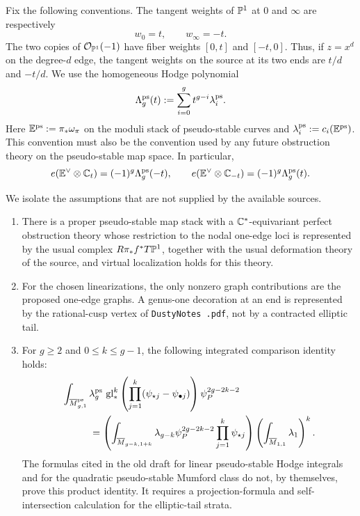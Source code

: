 \documentclass[12pt]{memoir}
\begin{document}
Fix the following conventions.  The tangent weights of \(\mathbb{P}^1\) at
\(0\) and \(\infty\) are respectively
\[
  w_0=t,\qquad w_\infty=-t.
\]
The two copies of \(\mathcal{O}_{\mathbb{P}^1}(-1)\) have fiber weights
\([0,t]\) and \([-t,0]\).  Thus, if \(z=x^d\) on the degree-\(d\)
edge, the tangent weights on the source at its two ends are \(t/d\)
and \(-t/d\).  We use the homogeneous Hodge polynomial
\[
  \Lambda_g^{\operatorname{\mathrm{ps}}}(t):=\sum_{i=0}^g t^{g-i}\lambda_i^{\operatorname{\mathrm{ps}}}.
\]
Here \(\mathbb{E}^{\operatorname{\mathrm{ps}}}:=\pi_*\omega_\pi\) on the moduli stack of
pseudo-stable curves and \(\lambda_i^{\operatorname{\mathrm{ps}}}:=c_i(\mathbb{E}^{\operatorname{\mathrm{ps}}})\).  This convention
must also be the convention used by any future obstruction theory on the
pseudo-stable map space.
In particular,
\[
 e(\mathbb{E}^\vee\otimes\mathbb{C}_t)=(-1)^g\Lambda_g^{\operatorname{\mathrm{ps}}}(-t),\qquad
 e(\mathbb{E}^\vee\otimes\mathbb{C}_{-t})=(-1)^g\Lambda_g^{\operatorname{\mathrm{ps}}}(t).
\]

We isolate the assumptions that are not supplied by the available sources.

\begin{enumerate}
  \item[(A1)] There is a proper pseudo-stable map stack with a
  \(\mathbb{C}^*\)-equivariant perfect obstruction theory whose restriction to the
  nodal one-edge loci is represented by the usual complex
  \(R\pi_*f^*T\mathbb{P}^1\), together with the usual deformation theory of the
  source, and virtual localization holds for this theory.

  \item[(A2)] For the chosen linearizations, the only nonzero graph
  contributions are the proposed one-edge graphs.  A genus-one decoration at
  an end is represented by the rational-cusp vertex of
  \texttt{DustyNotes .pdf}, not
  by a contracted elliptic tail.

  \item[(A3)] For \(g\geq2\) and \(0\leq k\leq g-1\), the following
  integrated comparison identity holds:
  \begin{align*}
   &\int_{\overline M^{\operatorname{\mathrm{ps}}}_{g,1}}
     \lambda_g^{\operatorname{\mathrm{ps}}}\,\operatorname{gl}_*^k
     \left(\prod_{j=1}^k(\psi_{\star j}-\psi_{\bullet j})\right)
     \psi_P^{2g-2k-2}\\
   &\hspace{1cm}=
     \left(\int_{\overline M_{g-k,1+k}}
       \lambda_{g-k}\psi_P^{2g-2k-2}\prod_{j=1}^k\psi_{\star j}\right)
     \left(\int_{\overline M_{1,1}}\lambda_1\right)^k.
  \end{align*}
  The formulas cited in the old draft for linear pseudo-stable Hodge
  integrals and for the quadratic pseudo-stable Mumford class do not, by
  themselves, prove this product identity.  It requires a projection-formula
  and self-intersection calculation for the elliptic-tail strata.
\end{enumerate}
\end{document}
